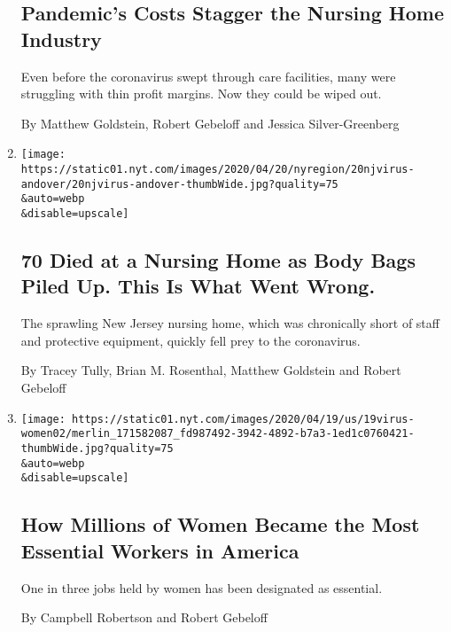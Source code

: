\begin{enumerate}
  \hypertarget{pandemics-costs-stagger-the-nursing-home-industry}{%
  \subsection{Pandemic's Costs Stagger the Nursing Home
  Industry}\label{pandemics-costs-stagger-the-nursing-home-industry}}

  Even before the coronavirus swept through care facilities, many were
  struggling with thin profit margins. Now they could be wiped out.

  By Matthew Goldstein, Robert Gebeloff and Jessica Silver-Greenberg
\item
  \href{/2020/04/19/nyregion/coronavirus-nj-andover-nursing-home-deaths.html}{}

  \texttt{[image: https://static01.nyt.com/images/2020/04/20/nyregion/20njvirus-andover/20njvirus-andover-thumbWide.jpg?quality=75\\\&auto=webp\\\&disable=upscale]}

  \hypertarget{70-died-at-a-nursing-home-as-body-bags-piled-up-this-is-what-went-wrong}{%
  \subsection{70 Died at a Nursing Home as Body Bags Piled Up. This Is
  What Went
  Wrong.}\label{70-died-at-a-nursing-home-as-body-bags-piled-up-this-is-what-went-wrong}}

  The sprawling New Jersey nursing home, which was chronically short of
  staff and protective equipment, quickly fell prey to the coronavirus.

  By Tracey Tully, Brian M. Rosenthal, Matthew Goldstein and Robert
  Gebeloff
\item
  \href{/2020/04/18/us/coronavirus-women-essential-workers.html}{}

  \texttt{[image: https://static01.nyt.com/images/2020/04/19/us/19virus-women02/merlin\_171582087\_fd987492-3942-4892-b7a3-1ed1c0760421-thumbWide.jpg?quality=75\\\&auto=webp\\\&disable=upscale]}

  \hypertarget{how-millions-of-women-became-the-most-essential-workers-in-america}{%
  \subsection{How Millions of Women Became the Most Essential Workers in
  America}\label{how-millions-of-women-became-the-most-essential-workers-in-america}}

  One in three jobs held by women has been designated as essential.

  By Campbell Robertson and Robert Gebeloff
\end{enumerate}

